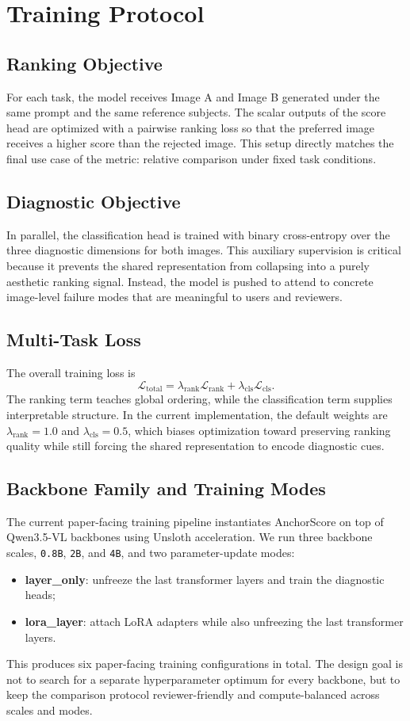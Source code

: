 \section{Training Protocol}

\subsection{Ranking Objective}
For each task, the model receives Image A and Image B generated under the same prompt and the same reference subjects. The scalar outputs of the score head are optimized with a pairwise ranking loss so that the preferred image receives a higher score than the rejected image. This setup directly matches the final use case of the metric: relative comparison under fixed task conditions.

\subsection{Diagnostic Objective}
In parallel, the classification head is trained with binary cross-entropy over the three diagnostic dimensions for both images. This auxiliary supervision is critical because it prevents the shared representation from collapsing into a purely aesthetic ranking signal. Instead, the model is pushed to attend to concrete image-level failure modes that are meaningful to users and reviewers.

\subsection{Multi-Task Loss}
The overall training loss is
\[
\mathcal{L}_{\text{total}} = \lambda_{\text{rank}}\mathcal{L}_{\text{rank}} + \lambda_{\text{cls}}\mathcal{L}_{\text{cls}}.
\]
The ranking term teaches global ordering, while the classification term supplies interpretable structure. In the current implementation, the default weights are $\lambda_{\text{rank}} = 1.0$ and $\lambda_{\text{cls}} = 0.5$, which biases optimization toward preserving ranking quality while still forcing the shared representation to encode diagnostic cues.

\subsection{Backbone Family and Training Modes}
The current paper-facing training pipeline instantiates AnchorScore on top of Qwen3.5-VL backbones using Unsloth acceleration. We run three backbone scales, \texttt{0.8B}, \texttt{2B}, and \texttt{4B}, and two parameter-update modes:
\begin{itemize}
    \item \textbf{layer\_only}: unfreeze the last transformer layers and train the diagnostic heads;
    \item \textbf{lora\_layer}: attach LoRA adapters while also unfreezing the last transformer layers.
\end{itemize}
This produces six paper-facing training configurations in total. The design goal is not to search for a separate hyperparameter optimum for every backbone, but to keep the comparison protocol reviewer-friendly and compute-balanced across scales and modes.

